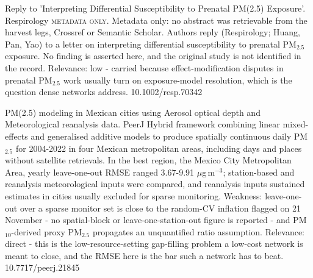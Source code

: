 \documentclass[10pt]{article}
\begin{document}
{Reply to 'Interpreting Differential Susceptibility to Prenatal PM(2.5) Exposure'.}
{Respirology}
{\textsc{metadata only.} Metadata only: no abstract was retrievable from the harvest legs, Crossref or Semantic Scholar. Authors reply (Respirology; Huang, Pan, Yao) to a letter on interpreting differential susceptibility to prenatal PM$_{2.5}$ exposure. No finding is asserted here, and the original study is not identified in the record. Relevance: low - carried because effect-modification disputes in prenatal PM$_{2.5}$ work usually turn on exposure-model resolution, which is the question dense networks address.}
{10.1002/resp.70342}

\par{}\baselineskip{}\baselineskip
{}

{PM(2.5) modeling in Mexican cities using Aerosol optical depth and Meteorological reanalysis data.}
{PeerJ}
{Hybrid framework combining linear mixed-effects and generalised additive models to produce spatially continuous daily PM$_{2.5}$ for 2004-2022 in four Mexican metropolitan areas, including days and places without satellite retrievals. In the best region, the Mexico City Metropolitan Area, yearly leave-one-out RMSE ranged 3.67-9.91 $\mu$g\,m$^{-3}$; station-based and reanalysis meteorological inputs were compared, and reanalysis inputs sustained estimates in cities usually excluded for sparse monitoring. Weakness: leave-one-out over a sparse monitor set is close to the random-CV inflation flagged on 21 November - no spatial-block or leave-one-station-out figure is reported - and PM$_{10}$-derived proxy PM$_{2.5}$ propagates an unquantified ratio assumption. Relevance: direct - this is the low-resource-setting gap-filling problem a low-cost network is meant to close, and the RMSE here is the bar such a network has to beat.}
{10.7717/peerj.21845}

\par{}\baselineskip{}\baselineskip
{}
\end{document}

